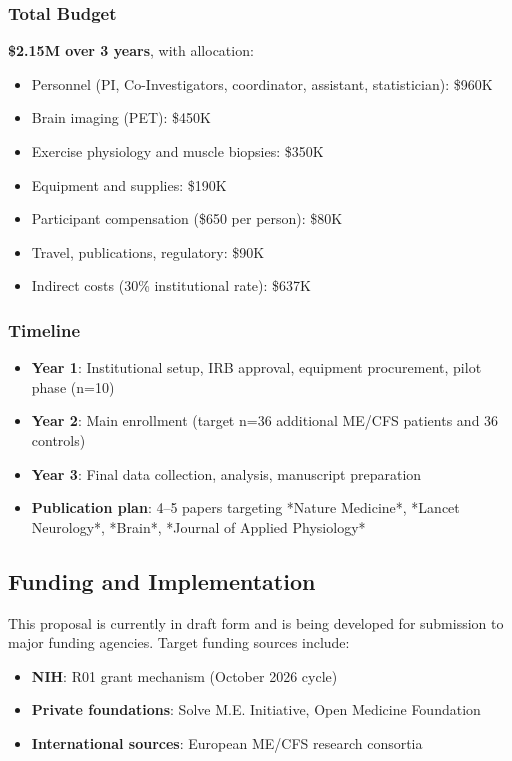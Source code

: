 \subsubsection{Total Budget}
\textbf{\$2.15M over 3 years}, with allocation:
\begin{itemize}
    \item Personnel (PI, Co-Investigators, coordinator, assistant, statistician): \$960K
    \item Brain imaging (PET): \$450K
    \item Exercise physiology and muscle biopsies: \$350K
    \item Equipment and supplies: \$190K
    \item Participant compensation (\$650 per person): \$80K
    \item Travel, publications, regulatory: \$90K
    \item Indirect costs (30\% institutional rate): \$637K
\end{itemize}

\subsubsection{Timeline}
\begin{itemize}
    \item \textbf{Year 1}: Institutional setup, IRB approval, equipment procurement, pilot phase (n=10)
    \item \textbf{Year 2}: Main enrollment (target n=36 additional ME/CFS patients and 36 controls)
    \item \textbf{Year 3}: Final data collection, analysis, manuscript preparation
    \item \textbf{Publication plan}: 4--5 papers targeting *Nature Medicine*, *Lancet Neurology*, *Brain*, *Journal of Applied Physiology*
\end{itemize}

\subsection{Funding and Implementation}

This proposal is currently in draft form and is being developed for submission to major funding agencies. Target funding sources include:

\begin{itemize}
    \item \textbf{NIH}: R01 grant mechanism (October 2026 cycle)
    \item \textbf{Private foundations}: Solve M.E. Initiative, Open Medicine Foundation
    \item \textbf{International sources}: European ME/CFS research consortia
\end{itemize}

